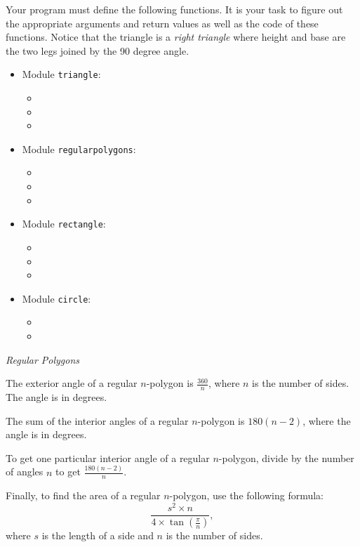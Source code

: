 \documentclass[11pt]{cselabheader}
\begin{document}
\begin{ex}
  Your program must define the following functions. It is your task to figure
  out the appropriate arguments and return values as well as the code of these
  functions. Notice that the triangle is a \emph{right triangle} where height
  and base are the two legs joined by the 90 degree angle.
  \begin{multicols}{2}
    \begin{itemize}
      \item Module \texttt{triangle}:
        \begin{itemize}
          \item {}
          \item {}
          \item {}
        \end{itemize}
      \item Module \texttt{regularpolygons}:
        \begin{itemize}
          \item {}
          \item {}
          \item {}
        \end{itemize}
      \item Module \texttt{rectangle}:
        \begin{itemize}
          \item{}
          \item {}
          \item {}
        \end{itemize}
      \item Module \texttt{circle}:
        \begin{itemize}
          \item {}
          \item {}
        \end{itemize}
    \end{itemize}
  \end{multicols}

  \emph{Regular Polygons}

  The exterior angle of a regular $n$-polygon is $\frac{360}{n}$, where $n$ is
  the number of sides. The angle is in degrees.

  The sum of the interior angles of a regular $n$-polygon is $180(n-2)$, where the
  angle is in degrees.

  To get one particular interior angle of a regular $n$-polygon, divide by the
  number of angles $n$ to get $\frac{180(n-2)}{n}$.

  Finally, to find the area of a regular $n$-polygon, use the following formula:
  \[ \frac{s^2 \times n}{4 \times \tan\left( \frac{\pi}{n} \right)}, \]
  where $s$ is the length of a side and $n$ is the number of sides.
\end{ex}
\end{document}
